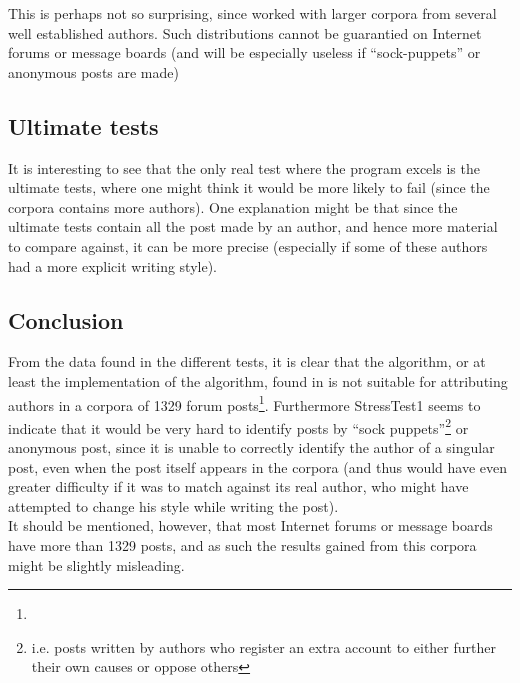 This is perhaps not so surprising, since \cite{nr4} worked with larger corpora from several well established authors. Such distributions cannot be guarantied on Internet forums or message boards (and will be especially useless if ``sock-puppets'' or anonymous posts are made) 

\subsection{Ultimate tests}
It is interesting to see that the only real test where the program excels is the ultimate tests, where one might think it would be more likely to fail (since the corpora contains more authors). One explanation might be that since the ultimate tests contain all the post made by an author, and hence more material to compare against, it can be more precise (especially if some of these authors had a more explicit writing style).

\subsection{Conclusion}
From the data found in the different tests, it is clear that the algorithm, or at least the implementation of the algorithm, found in \cite{nr4} is not suitable for attributing authors in a corpora of 1329 forum posts\footnote{}. Furthermore StressTest1 seems to indicate that it would be very hard to identify posts by ``sock puppets''\footnote{i.e. posts written by authors who register an extra account to either further their own causes or oppose others} or anonymous post, since it is unable to correctly identify the author of a singular post, even when the post itself appears in the corpora (and thus would have even greater difficulty if it was to match against its real author, who might have attempted to change his style while writing the post).\\ 

It should be mentioned, however, that most Internet forums or message boards have more than 1329 posts, and as such the results gained from this corpora might be slightly misleading.
